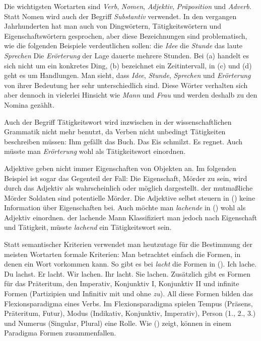 \documentclass[ number=45
			   ,series=eotms
			   ,printondemand
			  ]{langsci}
\begin{document}
{Die wichtigsten Wortarten sind \emph{Verb}, \emph{Nomen}, \emph{Adjektiv}, \emph{Präposition} und
\emph{Adverb}. Statt Nomen wird auch der Begriff \emph{Substantiv}
verwendet. In den vergangen Jahrhunderten hat man auch von Dingwörtern, Tätigkeitswörtern und Eigenschaftswörtern
gesprochen, aber diese Bezeichnungen sind problematisch, wie die folgenden Beispiele verdeutlichen
sollen:
\eal
\ex die \emph{Idee}
\ex die \emph{Stunde}
\ex das laute \emph{Sprechen}
\ex Die \emph{Erörterung} der Lage dauerte mehrere Stunden.
\zl
Bei (a) handelt es sich nicht um ein konkretes Ding, (b) bezeichnet ein Zeitintervall,
in (c) und (d) geht es um Handlungen. Man sieht, dass \emph{Idee}, \emph{Stunde},
\emph{Sprechen} und \emph{Erörterung} von ihrer Bedeutung her sehr unterschiedlich sind. Diese
Wörter verhalten sich aber dennoch in vielerlei Hinsicht wie \emph{Mann} und \emph{Frau} und werden
deshalb zu den Nomina gezählt.

Auch der Begriff Tätigkeitswort wird inzwischen in der wissenschaftlichen Grammatik nicht mehr
benutzt, da Verben nicht unbedingt Tätigkeiten beschreiben müssen:
\eal
\ex Ihm gefällt das Buch.
\ex Das Eis schmilzt.
\ex Es regnet.
\zl
Auch müsste man \emph{Erörterung} wohl als Tätigkeitswort einordnen.

Adjektive geben nicht immer Eigenschaften von Objekten an. Im folgenden Beispiel ist sogar das
Gegenteil der Fall: Die Eigenschaft, Mörder zu sein, wird durch das Adjektiv als wahrscheinlich
oder möglich dargestellt.
\eal
\ex der mutmaßliche Mörder
\ex Soldaten sind potentielle Mörder.
\zl
Die Adjektive selbst steuern in () keine Information über Eigenschaften bei. Auch möchte man \emph{lachende} in ()
wohl als Adjektiv einordnen.
\ea
der lachende Mann
\z
Klassifiziert man jedoch nach Eigenschaft und Tätigkeit, müsste \emph{lachend} ein Tätigkeitswort sein.

Statt semantischer Kriterien verwendet man heutzutage für die Bestimmung der meisten
Wortarten formale Kriterien: Man betrachtet einfach die Formen, in denen ein Wort vorkommen kann. So
gibt es \zb bei \emph{lacht} die Formen in (). 
\eal
\ex Ich lache.
\ex Du lachst.
\ex Er lacht.
\ex Wir lachen.
\ex Ihr lacht.
\ex Sie lachen.
\zl
Zusätzlich gibt es Formen für das Präteritum, den Imperativ, Konjunktiv I, Konjunktiv II und
infinite Formen (Partizipien und Infinitiv mit und ohne \emph{zu}). All diese Formen bilden das
Flexionsparadigma eines Verbs. Im Flexionsparadigma spielen
Tempus  (Präsens, Präteritum, Futur),
Modus (Indikativ, Konjunktiv, Imperativ),
Person (1., 2., 3.) und Numerus (Singular, Plural) eine Rolle. 
Wie () zeigt, können in einem Paradigma Formen zusammenfallen.

}
\end{document}

